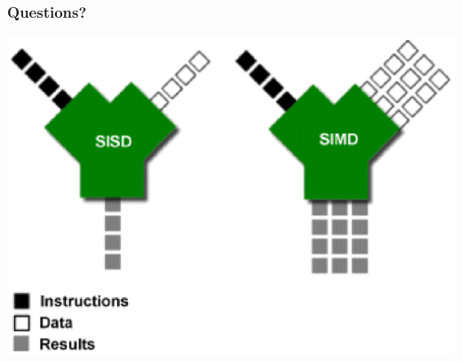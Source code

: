 \documentclass{beamer}
\begin{document}
\begin{frame} 
 \frametitle{Questions?}
 \includegraphics[width=1\textwidth]{SIMD}
\end{frame}
\end{document}
